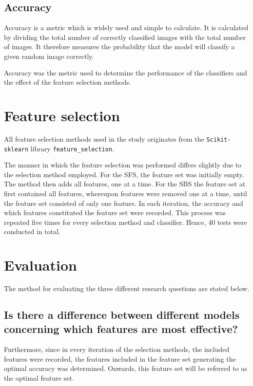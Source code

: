 \documentclass{kththesis}
\begin{document}
\subsection{Accuracy}

Accuracy is a metric which is widely used and simple to calculate.  
It is calculated by dividing the total number of correctly classified images with the total number of images. 
It therefore measures the probability that the model will classify a given random image correctly. \parencite{takiddin2021artificial}

Accuracy was the metric used to determine the performance of the classifiers and the effect of the feature selection methods.


\section{Feature selection}

All feature selection methods used in the study originates from the \verb|Scikit-sklearn| library \verb|feature_selection|.

The manner in which the feature  selection was performed differs slightly due to the selection method employed. For the SFS, the feature set was initially empty. The method then adds all features, one at a time. For the SBS the feature set at first contained all features, whereupon features were removed one at a time, until the feature set consisted of only one feature. In each iteration, the accuracy and which features constituted the feature set were recorded. 
This process was repeated five times for every selection method and classifier. Hence, 40 tests were conducted in total.

\section{Evaluation}

The method for evaluating the three different research questions are stated below.

\subsection{Is there a difference between different models concerning which features are most effective?}
Furthermore, since in every iteration of the selection methods, the included features were recorded, the features included in the feature set generating the optimal accuracy was determined. Onwards, this feature set will be referred to as the optimal feature set. 
\end{document}
